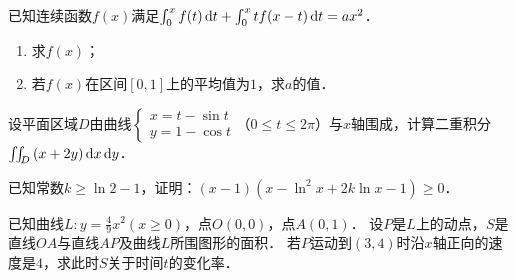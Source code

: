 \documentclass[plain,noanswer,medmath]{../../template/jnuexam}
\begin{document}




\begin{problem}[points=10]
已知连续函数$f(x)$满足$\int_0^x f(t)\mathop{}\!\mathrm{d} t + \int_0^x tf(x - t)\mathop{}\!\mathrm{d} t = ax^2$．
\begin{enumerate}
\item 求$f(x)$；
\item 若$f(x)$在区间$[0,1]$上的平均值为$1$，求$a$的值．
\end{enumerate}
\end{problem}


\begin{problem}[points=10]
设平面区域$D$由曲线$\begin{cases}
  x = t - \sin t \\
  y = 1 - \cos t
\end{cases}$（$0 \le t \le 2\pi$）与$x$轴围成，计算二重积分$\iint_D \left(x + 2y \right)\mathop{}\!\mathrm{d} x\mathop{}\!\mathrm{d} y$．
\end{problem}


\begin{problem}[points=10]
已知常数$k \ge \ln 2 - 1$，证明：$(x - 1)\left(x - \ln^2 x + 2k\ln x - 1 \right) \ge 0$．
\end{problem}




\begin{problem}[points=11]
已知曲线$L:y = \frac{4}{9}x^2\left(x \ge 0 \right)$，点$O\left(0,0 \right)$，点$A\left(0,1 \right)$．
设$P$是$L$上的动点，$S$是直线$OA$与直线$AP$及曲线$L$所围图形的面积．
若$P$运动到$\left(3,4 \right)$时沿$x$轴正向的速度是$4$，求此时$S$关于时间$t$的变化率．
\end{problem}






\end{document}

